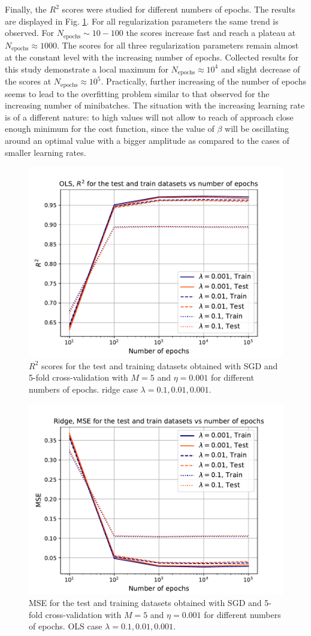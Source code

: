 \documentclass{emulateapj}
\begin{document}
Finally, the $R^2$ scores were studied for different numbers of epochs. The results are displayed in Fig. \ref{fig: R2_ridge_epochs}. For all regularization parameters the same trend is observed. For  $N_{\mathrm{epochs}}\sim 10-100$ the scores increase fast and reach a plateau at $N_{\mathrm{epochs}}\approx 1000$. The scores for all three regularization parameters remain almost at the constant level with the increasing number of epochs. Collected results for this study demonstrate a local maximum for $N_{\mathrm{epochs}}\approx10^4$ and slight decrease of the scores at $N_{\mathrm{epochs}}\approx10^5$. Practically, further increasing of the number of epochs seems to lead to the overfitting problem similar to that observed for the increasing number of minibatches. The situation with the increasing learning rate is of a different nature: to high values will not allow to reach of approach close enough minimum for the cost function, since the value of $\beta$ will be oscillating around an optimal value with a bigger amplitude as compared to the cases of smaller learning rates. 

\begin{figure}[t!]
    \centering
    \includegraphics[width=.49\textwidth]{Figures/ridge_R2_epochs.pdf}
    \caption{$R^2$ scores for the test and training datasets obtained with SGD and 5-fold cross-validation with $M=5$ and $\eta=0.001$ for different numbers of epochs. ridge case $\lambda=0.1,0.01,0.001$.}
    \label{fig: R2_ridge_epochs}
\end{figure}

\begin{figure}[h!]
    \centering
    \includegraphics[width=.49\textwidth]{Figures/ridge_MSE_epochs.pdf}
    \caption{MSE for the test and training datasets obtained with SGD and 5-fold cross-validation with $M=5$ and $\eta=0.001$ for different numbers of epochs. OLS case $\lambda=0.1,0.01,0.001$.}
    \label{fig: MSE_ridge_epochs}
\end{figure}
\end{document}
